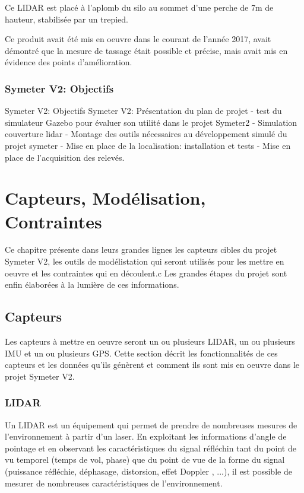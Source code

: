 \documentclass[12pt,a4paper]{report}
\begin{document}
		\para Ce LIDAR est placé à l'aplomb du silo au sommet d'une perche de 7m de hauteur, stabilisée par un trepied. 
		
		\para Ce produit avait été mis en oeuvre dans le courant de l'année 2017, avait démontré que la mesure de tassage était possible et précise, mais avait mis en évidence des points d'amélioration.
		

		\subsection{Symeter V2: Objectifs}
		Symeter V2: Objectifs
		Symeter V2: Présentation du plan de projet
- test du simulateur Gazebo pour évaluer son utilité dans le projet Symeter2
- Simulation couverture lidar
- Montage des outils nécessaires au développement simulé du projet symeter
- Mise en place de la localisation: installation et tests
- Mise en place de l'acquisition des relevés.

\chapter{Capteurs, Modélisation, Contraintes}
	Ce chapitre présente dans leurs grandes lignes les capteurs cibles du projet Symeter V2, les outils de modélistation qui seront utilisés pour les mettre en oeuvre et les contraintes qui en découlent.c Les grandes étapes du projet sont enfin élaborées à la lumière de ces informations.
	
	\section{Capteurs}
		Les capteurs à mettre en oeuvre seront un ou plusieurs LIDAR, un ou plusieurs IMU et un ou plusieurs GPS. Cette section décrit les fonctionnalités de ces capteurs et les données qu'ils génèrent et comment ils sont mis en oeuvre dans le projet Symeter V2.
		
			
		\subsection{LIDAR}
		Un LIDAR est un équipement qui permet de prendre de nombreuses mesures de l'environnement à partir d'un laser. En exploitant les informations d'angle de pointage et en observant les caractéristiques du signal réfléchin tant du point de vu temporel (temps de vol, phase) que du point de vue de la forme du signal (puissance réfléchie, déphasage, distorsion, effet Doppler , ...), il est possible de mesurer de nombreuses caractéristiques de l'environnement.
		
\end{document}
